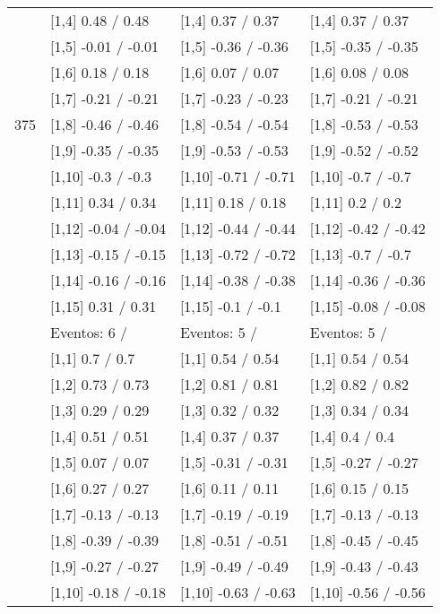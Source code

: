 \begin{table}
\begin{tabular}[t]{llll}
\addlinespace
 & {}[1,4] 0.48  / 0.48 & {}[1,4] 0.37  / 0.37 & {}[1,4] 0.37  / 0.37\\
 & {}[1,5] -0.01  / -0.01 & {}[1,5] -0.36  / -0.36 & {}[1,5] -0.35  / -0.35\\
 & {}[1,6] 0.18  / 0.18 & {}[1,6] 0.07  / 0.07 & {}[1,6] 0.08  / 0.08\\
 & {}[1,7] -0.21  / -0.21 & {}[1,7] -0.23  / -0.23 & {}[1,7] -0.21  / -0.21\\
375 & {}[1,8] -0.46  / -0.46 & {}[1,8] -0.54  / -0.54 & {}[1,8] -0.53  / -0.53\\
\addlinespace
 & {}[1,9] -0.35  / -0.35 & {}[1,9] -0.53  / -0.53 & {}[1,9] -0.52  / -0.52\\
 & {}[1,10] -0.3  / -0.3 & {}[1,10] -0.71  / -0.71 & {}[1,10] -0.7  / -0.7\\
 & {}[1,11] 0.34  / 0.34 & {}[1,11] 0.18  / 0.18 & {}[1,11] 0.2  / 0.2\\
 & {}[1,12] -0.04  / -0.04 & {}[1,12] -0.44  / -0.44 & {}[1,12] -0.42  / -0.42\\
 & {}[1,13] -0.15  / -0.15 & {}[1,13] -0.72  / -0.72 & {}[1,13] -0.7  / -0.7\\
\addlinespace
 & {}[1,14] -0.16  / -0.16 & {}[1,14] -0.38  / -0.38 & {}[1,14] -0.36  / -0.36\\
 & {}[1,15] 0.31  / 0.31 & {}[1,15] -0.1  / -0.1 & {}[1,15] -0.08  / -0.08\\
 & Eventos:  6 / & Eventos:  5 / & Eventos:  5 /\\
 & {}[1,1] 0.7  / 0.7 & {}[1,1] 0.54  / 0.54 & {}[1,1] 0.54  / 0.54\\
 & {}[1,2] 0.73  / 0.73 & {}[1,2] 0.81  / 0.81 & {}[1,2] 0.82  / 0.82\\
\addlinespace
 & {}[1,3] 0.29  / 0.29 & {}[1,3] 0.32  / 0.32 & {}[1,3] 0.34  / 0.34\\
 & {}[1,4] 0.51  / 0.51 & {}[1,4] 0.37  / 0.37 & {}[1,4] 0.4  / 0.4\\
 & {}[1,5] 0.07  / 0.07 & {}[1,5] -0.31  / -0.31 & {}[1,5] -0.27  / -0.27\\
 & {}[1,6] 0.27  / 0.27 & {}[1,6] 0.11  / 0.11 & {}[1,6] 0.15  / 0.15\\
 & {}[1,7] -0.13  / -0.13 & {}[1,7] -0.19  / -0.19 & {}[1,7] -0.13  / -0.13\\
\addlinespace
500 & {}[1,8] -0.39  / -0.39 & {}[1,8] -0.51  / -0.51 & {}[1,8] -0.45  / -0.45\\
 & {}[1,9] -0.27  / -0.27 & {}[1,9] -0.49  / -0.49 & {}[1,9] -0.43  / -0.43\\
 & {}[1,10] -0.18  / -0.18 & {}[1,10] -0.63  / -0.63 & {}[1,10] -0.56  / -0.56\\

\end{tabular}
\end{table}
